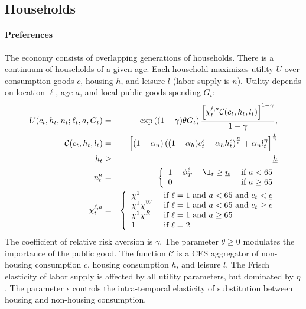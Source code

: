 \documentclass[letterpaper,12pt,dvipsnames,usenames]{article}
\theoremstyle{definition}
\begin{document}
\begin{spacing}{1.25}
\subsection{Households}

\paragraph{Preferences}
The economy consists of overlapping generations of households. There is a continuum of households of a given age. Each household maximizes utility $U$ over consumption goods $c$, housing $h$, and leisure $l$ (labor supply is $n$). Utility depends on location $\ell$, age $a$, and local public goods spending $G_t$:
\begin{eqnarray}
U(c_{t},h_{t},n_{t};\ell_{t},a,G_{t}) &=& \exp\left((1-\gamma) \theta G_t\right)  \frac{\left[\chi_{t}^{\ell,a} \mathcal{C}(c_{t},h_{t},l_t)\right]^{1-\gamma} }{1-\gamma} , \label{eq:prefs} \\
\mathcal{C}(c_t,h_t,l_t)&=&\left[(1-\alpha_n)\left((1-\alpha_h) c_t^{\epsilon} + \alpha_h h_t^{\epsilon}\right)^{\frac{\eta}{\epsilon}}+ \alpha_n l_t^{\eta}\right]^{\frac{1}{\eta}}   \label{eq:prefkernel}\\
 h_t &\geq& \underline{h} \label{eq:minhousesize} \\
n^a_t &=& \left\{\begin{array}{ll}1-\phi_{T}^\ell-\l_t \geq\underline{n}  & \text{  if  } a<65  \\
 0 & \text{  if  } a\geq65 \label{eq:minhours}
 \end{array}  \right. \\
\chi_{t}^{\ell,a}&=&\left\{\begin{array}{ll} \label{eq:shifter}
\chi^{1}  & \text{  if  } \ell=1 \text{ and  } a<65 \text{  and  } c_t<\underline{c}
\\ \chi^{1}\chi^W  & \text{  if  } \ell=1 \text{ and  } a<65 \text{  and  } c_t\geq\underline{c} \\
\chi^{1}\chi^R  & \text{  if  } \ell=1 \text{ and  } a\geq65 \\
1 &\text{  if  } \ell=2   \\
\end{array}  \right.
\end{eqnarray}
The coefficient of relative risk aversion is $\gamma$. The parameter $\theta \geq 0$ modulates the importance of the public good. The  function $\mathcal{C}$ is a CES aggregator of non-housing consumption $c$, housing consumption $h$, and leisure $l$. The Frisch elasticity of labor supply is affected by all utility parameters, but dominated by $\eta$. The parameter $\epsilon$ controls the intra-temporal elasticity of substitution between housing and non-housing consumption.


\end{spacing}
\end{document}
